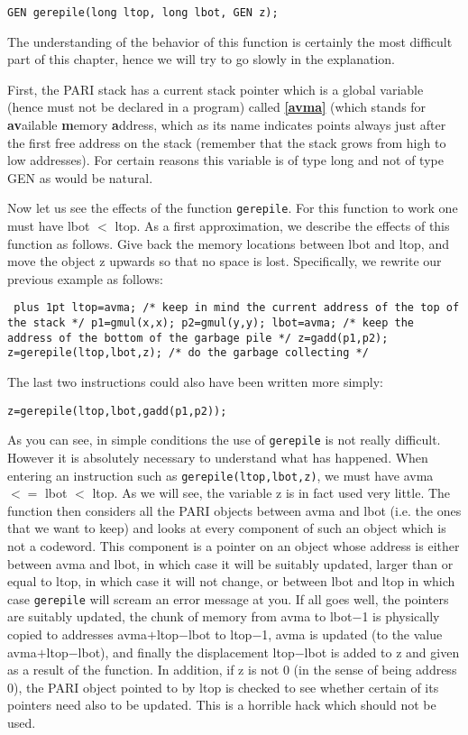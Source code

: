{\tt GEN gerepile(long ltop, long lbot, GEN z);}

The understanding of the behavior of this function is certainly the most
difficult part of this chapter, hence we will try to go slowly in the
explanation.

First, the PARI stack has a current stack pointer which is a global variable
(hence must not be declared in a program) called {\bf \ref{avma}} (which stands for
{\bf av}ailable {\bf m}emory {\bf a}ddress, which as its name indicates
points always just after the first free address on the stack (remember
that the stack grows from high to low addresses). For certain reasons
this variable is of type long and not of type GEN as would be natural.

Now let us see the effects of the function {\tt gerepile}.
For this function to work one must have lbot $<$ ltop. As a first 
approximation, we describe the effects of this function as follows.
Give back the memory locations between lbot and ltop, and move the object z
upwards so that no space is lost. Specifically, we rewrite our previous
example as follows:

{\tt \obeylines\parskip=0pt plus 1pt
\hbox{}
ltop=avma; /* keep in mind the current address of the top of the stack */
p1=gmul(x,x); p2=gmul(y,y);
lbot=avma; /* keep the address of the bottom of the garbage pile */
z=gadd(p1,p2);
z=gerepile(ltop,lbot,z); /* do the garbage collecting */}

The last two instructions could also have been written more simply:

{\tt z=gerepile(ltop,lbot,gadd(p1,p2));}

As you can see, in simple conditions the use of {\tt gerepile} is not really
difficult. However it is absolutely necessary to understand what has
happened. When entering an instruction such as {\tt gerepile(ltop,lbot,z)},
we must have avma $<=$ lbot $<$ ltop. As we will see, the variable z is in fact
used very little. The function then considers all the PARI objects between
avma and lbot (i.e. the ones that we want to keep) and looks at every
component of such an object which is not a codeword. This component is a
pointer on an object whose address is either between avma and lbot, in which
case it will be suitably updated, larger than or equal to ltop, in which case
it will not change, or between lbot and ltop in which case {\tt gerepile} will
scream an error message at you. If all goes well, the pointers are suitably
updated, the chunk of memory from avma to lbot$-$1 is physically copied to
addresses avma$+$ltop$-$lbot to ltop$-$1, avma is updated (to the value
avma$+$ltop$-$lbot), and finally the displacement ltop$-$lbot is added to z and
given as a result of the function. In addition, if z is not 0 (in the sense
of being address 0), the PARI object pointed to by ltop is checked to see
whether certain of its pointers need also to be updated. This is a horrible
hack which should not be used.

